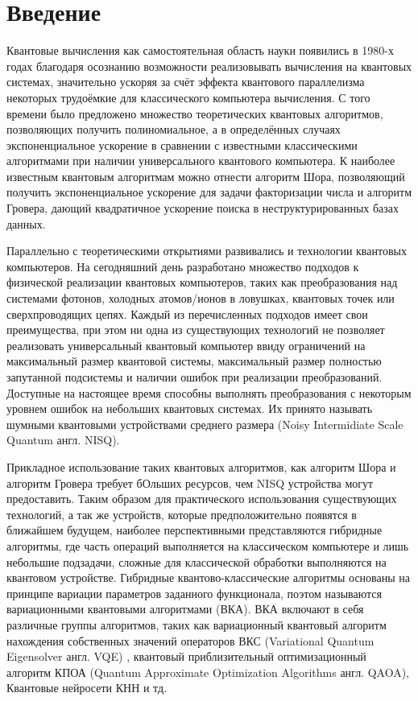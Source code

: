 \documentclass[12pt]{extarticle}
\begin{document}

\section{Введение}

\qquad Квантовые вычисления как самостоятельная область науки появились в 1980-х годах благодаря осознанию возможности реализовывать вычисления на квантовых системах, значительно ускоряя за счёт эффекта квантового параллелизма некоторых трудоёмкие для классического компьютера вычисления. С того времени было предложено множество теоретических квантовых алгоритмов, позволяющих получить полиномиальное, а в определённых случаях экспоненциальное ускорение в сравнении с известными классическими алгоритмами при наличии универсального квантового компьютера. К наиболее известным квантовым алгоритмам можно отнести алгоритм Шора, позволяющий получить экспоненциальное ускорение для задачи факторизации числа и алгоритм Гровера, дающий квадратичное ускорение поиска в неструктурированных базах данных.

\qquad Параллельно с теоретическими открытиями развивались и технологии квантовых компьютеров. На сегодняшний день разработано множество подходов к физической реализации квантовых компьютеров, таких как преобразования над системами фотонов, холодных атомов/ионов в ловушках, квантовых точек или сверхпроводящих цепях. Каждый из перечисленных подходов имеет свои преимущества, при этом ни одна из существующих технологий не позволяет реализовать универсальный квантовый компьютер ввиду ограничений на максимальный размер квантовой системы, максимальный размер полностью запутанной подсистемы и наличии ошибок при реализации преобразований. Доступные на настоящее время способны выполнять преобразования с некоторым уровнем ошибок на небольших квантовых системах. Их принято называть шумными квантовыми устройствами среднего размера (Noisy Intermidiate Scale Quantum англ. NISQ). 

\qquad Прикладное использование таких квантовых алгоритмов, как алгоритм Шора и алгоритм Гровера требует бОльших ресурсов, чем NISQ устройства могут предоставить. Таким образом для практического использования существующих технологий, а так же устройств, которые предположительно появятся в ближайшем будущем, наиболее перспективными представляются гибридные алгоритмы, где часть операций выполняется на классическом компьютере и лишь небольшие подзадачи, сложные для классической обработки выполняются на квантовом устройстве. Гибридные квантово-классические алгоритмы основаны на принципе вариации параметров заданного функционала, поэтом называются вариационными квантовыми алгоритмами (ВКА). ВКА включают в себя различные группы алгоритмов, таких как вариационный квантовый алгоритм нахождения собственных значений операторов ВКС (Variational Quantum Eigensolver англ. VQE) \cite{VQE_review}, квантовый приблизительный оптимизационный алгоритм КПОА (Quantum Approximate Optimization Algorithms англ. QAOA), Квантовые нейросети КНН и тд. 
\end{document}
